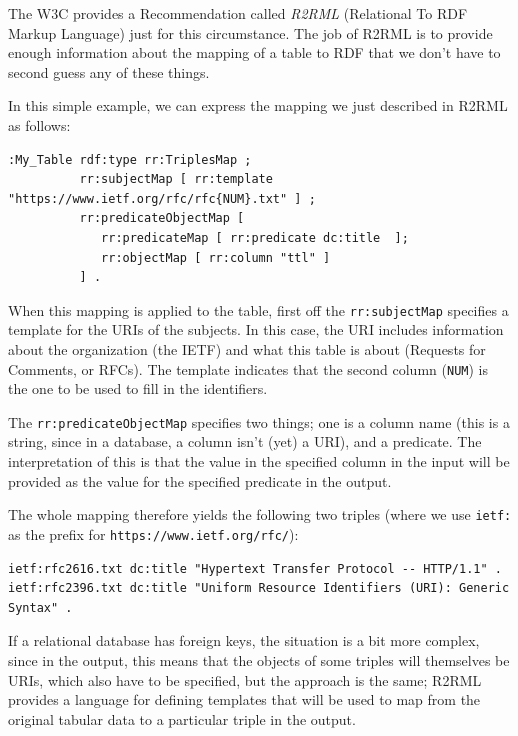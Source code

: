 The W3C provides a Recommendation called \emph{R2RML} (Relational To RDF Markup Language)
just for this circumstance.  The job of R2RML is to provide enough information about 
the mapping of a table to RDF that we don't have to second guess any of these things. 

In this simple example, we can express the mapping we just described in R2RML as follows: 

\begin{lstlisting}
:My_Table rdf:type rr:TriplesMap ;
          rr:subjectMap [ rr:template "https://www.ietf.org/rfc/rfc{NUM}.txt" ] ;
          rr:predicateObjectMap [
             rr:predicateMap [ rr:predicate dc:title  ];
             rr:objectMap [ rr:column "ttl" ]
          ] .
\end{lstlisting}

When this mapping is applied to the table, first off the \texttt{rr:subjectMap} 
specifies a template for the URIs of the subjects.  In this case, the URI 
includes information about the organization (the IETF) and what this table is
about  (Requests for Comments, or RFCs).  The template indicates that the second 
column (\texttt{NUM}) is the one to be used to fill in the identifiers. 

The \texttt{rr:predicateObjectMap} specifies two things; one is a column name 
(this is a string, since in a database, a column isn't (yet) a URI), and a predicate. 
The interpretation of this is that the value in the specified column in the input will be 
provided as the value for the specified predicate in the output. 

The whole mapping therefore yields the following two triples (where we use \texttt{ietf:} as 
the prefix for \texttt{https://www.ietf.org/rfc/}):

\begin{lstlisting}
ietf:rfc2616.txt dc:title "Hypertext Transfer Protocol -- HTTP/1.1" .
ietf:rfc2396.txt dc:title "Uniform Resource Identifiers (URI): Generic Syntax" .
\end{lstlisting}

If a relational database has foreign keys, the situation is a bit more complex, since 
in the output, this means that the objects of some triples will themselves be 
URIs, which also have to be specified, but the approach is the same; R2RML provides
a language for defining templates that will be used to map from the original tabular 
data to a particular triple in the output. 



